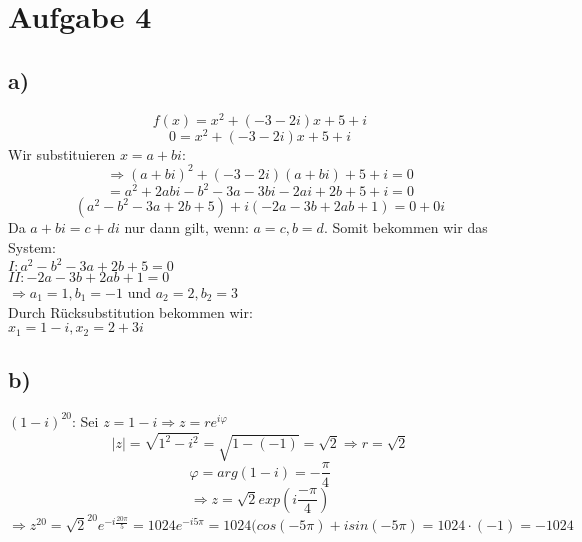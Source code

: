 \section{Aufgabe 4}
    \subsection{a)}
        $$f(x) = x^2+(-3-2i)x+5+i$$
        $$0 = x^2+(-3-2i)x+5+i$$
        Wir substituieren $x=a+bi$:
        $$\Rightarrow (a+bi)^2+(-3-2i)(a+bi)+5+i=0$$
        $$=a^2+2abi-b^2-3a-3bi-2ai+2b+5+i=0$$
        $$(a^2-b^2-3a+2b+5)+i(-2a-3b+2ab+1)=0+0i$$
        Da $a+bi=c+di$ nur dann gilt, wenn: $a=c, b=d$. Somit bekommen wir das System: \\
        $I:a^2-b^2-3a+2b+5=0$ \\
        $II:-2a-3b+2ab+1=0$ \\
        $\Rightarrow a_1=1,b_1=-1$ und $a_2=2,b_2=3$ \\
        Durch Rücksubstitution bekommen wir: \\
        $x_1=1-i,x_2=2+3i$

    \subsection{b)}
        $(1-i)^{20}$: Sei $z=1-i \Rightarrow z=re^{i\varphi}$ 
        $$|z|=\sqrt{1^2-i^2}=\sqrt{1-(-1)}=\sqrt{2}\Rightarrow r=\sqrt{2}$$
        $$\varphi=arg(1-i)=-\frac{\pi}{4}$$
        $$\Rightarrow z = \sqrt2 exp(i\frac{-\pi}{4})$$
        $$\Rightarrow z^{20}=\sqrt2^{20}e^{-i\frac{20\pi}{5}}=1024e^{-i5\pi}=1024(cos(-5\pi)+isin(-5\pi)=1024\cdot(-1)=-1024$$
        